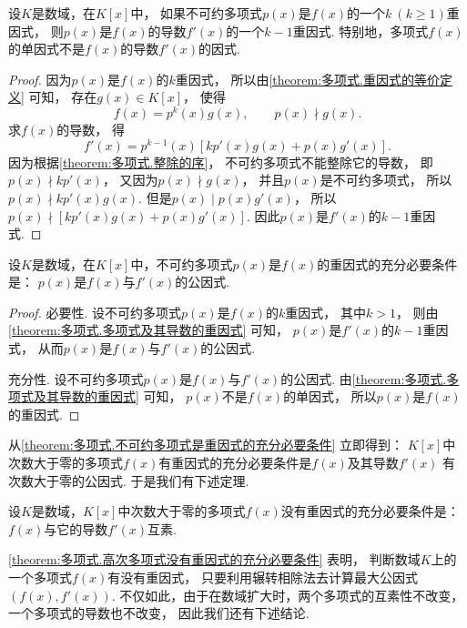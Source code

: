\begin{theorem}\label{theorem:多项式.多项式及其导数的重因式}
设\(K\)是数域，在\(K[x]\)中，
如果不可约多项式\(p(x)\)是\(f(x)\)的一个\(k\ (k\geq1)\)重因式，
则\(p(x)\)是\(f(x)\)的导数\(f'(x)\)的一个\(k-1\)重因式.
特别地，多项式\(f(x)\)的单因式不是\(f(x)\)的导数\(f'(x)\)的因式.
\begin{proof}
因为\(p(x)\)是\(f(x)\)的\(k\)重因式，
所以由\cref{theorem:多项式.重因式的等价定义} 可知，
存在\(g(x) \in K[x]\)，
使得\[
	f(x) = p^k(x) g(x), \qquad
	p(x) \nmid g(x).
\]
求\(f(x)\)的导数，
得\[
	f'(x) = p^{k-1}(x) [ k p'(x) g(x) + p(x) g'(x) ].
\]
因为根据\cref{theorem:多项式.整除的序}，
不可约多项式不能整除它的导数，
即\(p(x) \nmid k p'(x)\)，
又因为\(p(x) \nmid g(x)\)，
并且\(p(x)\)是不可约多项式，
所以\(p(x) \nmid k p'(x) g(x)\).
但是\(p(x) \mid p(x) g'(x)\)，
所以\(p(x) \nmid [k p'(x) g(x) + p(x) g'(x)]\).
因此\(p(x)\)是\(f'(x)\)的\(k-1\)重因式.
\end{proof}
\end{theorem}

\begin{corollary}\label{theorem:多项式.不可约多项式是重因式的充分必要条件}
设\(K\)是数域，在\(K[x]\)中，不可约多项式\(p(x)\)是\(f(x)\)的重因式的充分必要条件是：
\(p(x)\)是\(f(x)\)与\(f'(x)\)的公因式.
\begin{proof}
必要性.
设不可约多项式\(p(x)\)是\(f(x)\)的\(k\)重因式，
其中\(k>1\)，
则由\cref{theorem:多项式.多项式及其导数的重因式} 可知，
\(p(x)\)是\(f'(x)\)的\(k-1\)重因式，
从而\(p(x)\)是\(f(x)\)与\(f'(x)\)的公因式.

充分性.
设不可约多项式\(p(x)\)是\(f(x)\)与\(f'(x)\)的公因式.
由\cref{theorem:多项式.多项式及其导数的重因式} 可知，
\(p(x)\)不是\(f(x)\)的单因式，
所以\(p(x)\)是\(f(x)\)的重因式.
\end{proof}
\end{corollary}
从\cref{theorem:多项式.不可约多项式是重因式的充分必要条件} 立即得到：
\(K[x]\)中次数大于零的多项式\(f(x)\)有重因式的充分必要条件是\(f(x)\)及其导数\(f'(x)\)
有次数大于零的公因式.
于是我们有下述定理.
\begin{theorem}\label{theorem:多项式.高次多项式没有重因式的充分必要条件}
设\(K\)是数域，\(K[x]\)中次数大于零的多项式\(f(x)\)没有重因式的充分必要条件是：
\(f(x)\)与它的导数\(f'(x)\)互素.
\end{theorem}

\cref{theorem:多项式.高次多项式没有重因式的充分必要条件} 表明，
判断数域\(K\)上的一个多项式\(f(x)\)有没有重因式，
只要利用辗转相除法去计算最大公因式\((f(x),f'(x))\).
不仅如此，由于在数域扩大时，两个多项式的互素性不改变，一个多项式的导数也不改变，
因此我们还有下述结论.

